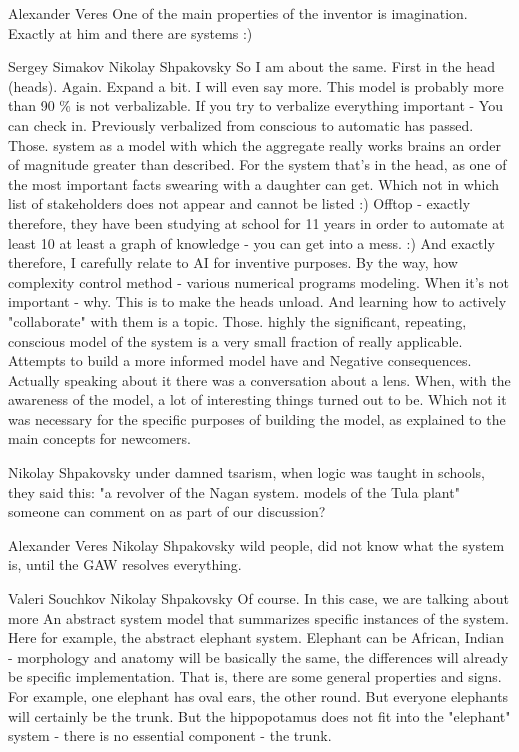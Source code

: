 \documentclass[11pt,a4paper]{article}
\begin{document}
Alexander Veres One of the main properties of the inventor is
imagination. Exactly at him and there are systems :)

Sergey Simakov Nikolay Shpakovsky So I am about the same. First in the head
(heads). Again. Expand a bit. I will even say more. This model is probably
more than 90 \% is not verbalizable. If you try to verbalize everything
important - You can check in. Previously verbalized from conscious to
automatic has passed. Those. system as a model with which the aggregate really
works brains an order of magnitude greater than described. For the system
that’s in the head, as one of the most important facts swearing with a
daughter can get. Which not in which list of stakeholders does not appear and
cannot be listed :) Offtop - exactly therefore, they have been studying at
school for 11 years in order to automate at least 10%
at least a graph of knowledge - you can get into a mess. :) And exactly
therefore, I carefully relate to AI for inventive purposes. By the way, how
complexity control method - various numerical programs modeling. When it’s not
important - why. This is to make the heads unload. And learning how to
actively "collaborate" with them is a topic. Those. highly the significant,
repeating, conscious model of the system is a very small fraction of really
applicable. Attempts to build a more informed model have and Negative
consequences. Actually speaking about it there was a conversation about a
lens. When, with the awareness of the model, a lot of interesting things
turned out to be. Which not it was necessary for the specific purposes of
building the model, as explained to the main concepts for newcomers.

Nikolay Shpakovsky under damned tsarism, when logic was taught in schools,
they said this: "a revolver of the Nagan system. models of the Tula plant"
someone can comment on as part of our discussion?

Alexander Veres Nikolay Shpakovsky wild people, did not know what the system
is, until the GAW resolves everything.

Valeri Souchkov Nikolay Shpakovsky Of course. In this case, we are talking
about more An abstract system model that summarizes specific instances of the
system. Here for example, the abstract elephant system. Elephant can be
African, Indian - morphology and anatomy will be basically the same, the
differences will already be specific implementation. That is, there are some
general properties and signs. For example, one elephant has oval ears, the
other round. But everyone elephants will certainly be the trunk. But the
hippopotamus does not fit into the "elephant" system - there is no essential
component - the trunk.
\end{document}
